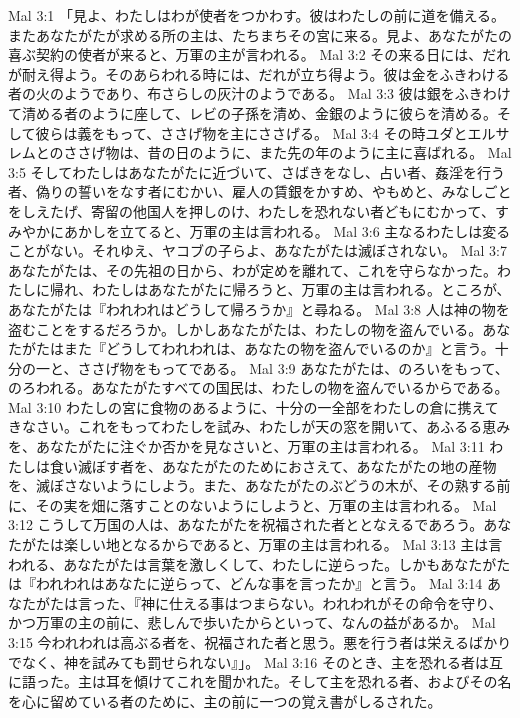 Mal 3:1  「見よ、わたしはわが使者をつかわす。彼はわたしの前に道を備える。またあなたがたが求める所の主は、たちまちその宮に来る。見よ、あなたがたの喜ぶ契約の使者が来ると、万軍の主が言われる。
Mal 3:2  その来る日には、だれが耐え得よう。そのあらわれる時には、だれが立ち得よう。彼は金をふきわける者の火のようであり、布さらしの灰汁のようである。
Mal 3:3  彼は銀をふきわけて清める者のように座して、レビの子孫を清め、金銀のように彼らを清める。そして彼らは義をもって、ささげ物を主にささげる。
Mal 3:4  その時ユダとエルサレムとのささげ物は、昔の日のように、また先の年のように主に喜ばれる。
Mal 3:5  そしてわたしはあなたがたに近づいて、さばきをなし、占い者、姦淫を行う者、偽りの誓いをなす者にむかい、雇人の賃銀をかすめ、やもめと、みなしごとをしえたげ、寄留の他国人を押しのけ、わたしを恐れない者どもにむかって、すみやかにあかしを立てると、万軍の主は言われる。
Mal 3:6  主なるわたしは変ることがない。それゆえ、ヤコブの子らよ、あなたがたは滅ぼされない。
Mal 3:7  あなたがたは、その先祖の日から、わが定めを離れて、これを守らなかった。わたしに帰れ、わたしはあなたがたに帰ろうと、万軍の主は言われる。ところが、あなたがたは『われわれはどうして帰ろうか』と尋ねる。
Mal 3:8  人は神の物を盗むことをするだろうか。しかしあなたがたは、わたしの物を盗んでいる。あなたがたはまた『どうしてわれわれは、あなたの物を盗んでいるのか』と言う。十分の一と、ささげ物をもってである。
Mal 3:9  あなたがたは、のろいをもって、のろわれる。あなたがたすべての国民は、わたしの物を盗んでいるからである。
Mal 3:10  わたしの宮に食物のあるように、十分の一全部をわたしの倉に携えてきなさい。これをもってわたしを試み、わたしが天の窓を開いて、あふるる恵みを、あなたがたに注ぐか否かを見なさいと、万軍の主は言われる。
Mal 3:11  わたしは食い滅ぼす者を、あなたがたのためにおさえて、あなたがたの地の産物を、滅ぼさないようにしよう。また、あなたがたのぶどうの木が、その熟する前に、その実を畑に落すことのないようにしようと、万軍の主は言われる。
Mal 3:12  こうして万国の人は、あなたがたを祝福された者ととなえるであろう。あなたがたは楽しい地となるからであると、万軍の主は言われる。
Mal 3:13  主は言われる、あなたがたは言葉を激しくして、わたしに逆らった。しかもあなたがたは『われわれはあなたに逆らって、どんな事を言ったか』と言う。
Mal 3:14  あなたがたは言った、『神に仕える事はつまらない。われわれがその命令を守り、かつ万軍の主の前に、悲しんで歩いたからといって、なんの益があるか。
Mal 3:15  今われわれは高ぶる者を、祝福された者と思う。悪を行う者は栄えるばかりでなく、神を試みても罰せられない』」。
Mal 3:16  そのとき、主を恐れる者は互に語った。主は耳を傾けてこれを聞かれた。そして主を恐れる者、およびその名を心に留めている者のために、主の前に一つの覚え書がしるされた。
